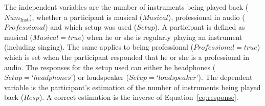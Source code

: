 The independent variables are the number of instruments being played back ($\textit{Num}_{\mathrm{Inst}}$), whether a participant is musical ($\textit{Musical}$), professional in audio ($\textit{Professional}$) and which setup was used ($\textit{Setup}$). A participant is defined as musical ($\textit{Musical} = true$) when he or she is regularly playing an instrument (including singing). The same applies to being professional ($\textit{Professional} = true$) which is set when the participant responded that he or she is a professional in audio. The responses for the setup used can either be headphones ($\textit{Setup} = \textrm{`}headphones\textrm{'}$) or loudspeaker ($\textit{Setup} = \textrm{`}loudspeaker\textrm{'}$). The dependent variable is the participant's estimation of the number of instruments being played back ($\textit{Resp}$). A correct estimation is the inverse of Equation~\ref{eq:response}.



